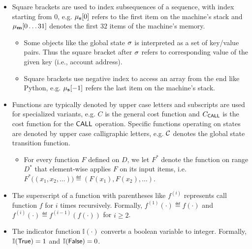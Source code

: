 \begin{itemize}[nosep]

	\item Square brackets are used to index subsequences of a sequence, with index starting from $0$, e.g. $\mathbf{\mu}_{\mathbf{s}}[0]$ refers to the first item on the machine's stack and $\mathbf{\mu}_{\mathbf{m}}[0\dots 31]$ denotes the first $32$ items of the machine's memory.
	\begin{itemize}[nosep]
		\item Some objects like the global state $\mathbf{\sigma}$ is interpreted as a set of key/value pairs.
		Thus the square bracket after $\mathbf{\sigma}$ refers to corresponding value of the given key (i.e., account address). 
		\item Square brackets use negative index to access an array from the end like Python, e.g. $\mathbf{\mu}_{\mathbf{s}}[-1]$ refers the last item on the machine's stack. 
	\end{itemize}


	\item Functions are typically denoted by upper case letters and subscripts are used for specialized variants, e.g. $C$ is the general cost function and $C_{\mathsf{CALL}}$ is the cost function for the $\mathsf{CALL}$ operation.
	Specific functions operating on states are denoted by upper case calligraphic letters, e.g. $\mathcal{C}$ denotes the {\name} global state transition function.
	\begin{itemize}[nosep]
		\item For every function $F$ defined on $D$, we let $F^*$ denote the function on range $D^*$ that element-wise applies $F$ on its input items, i.e. $F^*\big( \left(x_1, x_2, \dots\right) \big) \eqdef \left( F(x_1), F(x_2),\dots \right)$. 
	\end{itemize}

	\item The superscript of a function with parentheses like $f^{(i)}$ represents call function $f$ for $i$ times recursively. Formally, $f^{(1)}(\cdot)\eqdef f(\cdot)$ and $f^{(i)}(\cdot)\eqdef f^{(i-1)}(f(\cdot))$ for $i\ge 2$.
	
	\item The indicator function $\mathbb{I}(\cdot)$ converts a boolean variable to integer. Formally, $\mathbb{I}(\mathsf{True})=1$ and $\mathbb{I}(\mathsf{False})=0$.

\end{itemize}  

\smallskip

